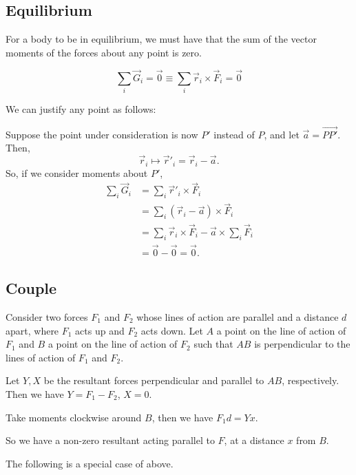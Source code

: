 \documentclass[12pt]{article}
\begin{document}
\subsection*{Equilibrium}

For a body to be in equilibrium, we must have that
the sum of the vector moments of the forces
about any point is zero.

\begin{equation}
\sum\limits_{i}^{}\vec{G}_i = \vec{0} \equiv \sum\limits_{i}^{} \vec{r}_i \times \vec{F}_i = \vec{0}
\end{equation}

We can justify any point as follows:

Suppose the point under consideration is now $P'$ instead of $P$,
and let $\vec{a} = \overrightarrow{PP'}$. Then,
\[
\vec{r}_i \mapsto \vec{r}'_i = \vec{r}_i - \vec{a}.
\]
So, if we consider moments about $P'$,
\begin{align*}
    \sum\limits_{i}^{}\vec{G}_i &= \sum\limits_{i}^{} \vec{r}'_i \times \vec{F}_i\\
                                &= \sum\limits_{i}^{}(\vec{r}_i - \vec{a}) \times \vec{F}_i\\
                                &= \sum\limits_{i}^{}\vec{r}_i \times \vec{F}_i - \vec{a} \times\sum\limits_{i}^{} \vec{F}_i\\
                                &= \vec{0} - \vec{0} = \vec{0}.
\end{align*}

\subsection*{Couple}

Consider two forces $F_{1}$ and $F_{2}$ whose lines of action
are parallel and a distance $d$ apart,
where $F_{1}$ acts up and $F_{2}$ acts down.
Let $A$ a point on the line of action of $F_{1}$
and $B$ a point on the line of action of $F_{2}$ 
such that $AB$ is perpendicular to the lines of action of $F_{1}$ and $F_{2}$.

Let $Y,X$ be the resultant forces
perpendicular and parallel to $AB$, respectively.
Then we have $Y = F_{1} - F_{2}$, $X = 0$.

Take moments clockwise around $B$,
then we have $F_{1}d = Yx$.

So we have a non-zero resultant acting parallel to $F$,
at a distance $x$ from $B$.

The following is a special case of
above.
\end{document}
